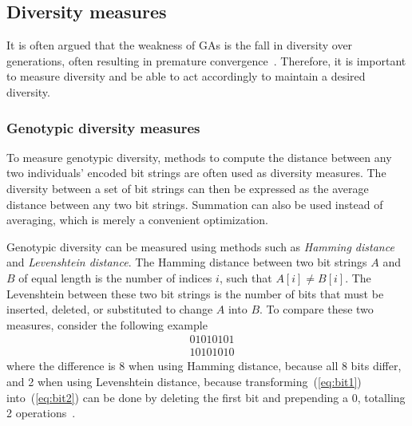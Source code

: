 \subsection{Diversity measures}
\label{sec:diversitymeasures}
It is often argued that the weakness of GAs is the fall in diversity over generations, often resulting in premature convergence~\cite{diaz2007empirical, 1266373,Zitzler00comparisonof}. Therefore, it is important to measure diversity and be able to act accordingly to maintain a desired diversity.

\subsubsection{Genotypic diversity measures}
To measure genotypic diversity, methods to compute the distance between any two individuals' encoded bit strings are often used as diversity measures. The diversity between a set of bit strings can then be expressed as the average distance between any two bit strings. Summation can also be used instead of averaging, which is merely a convenient optimization.

Genotypic diversity can be measured using methods such as \emph{Hamming distance} and \emph{Levenshtein distance}. The Hamming distance between two bit strings $A$ and $B$ of equal length is the number of indices $i$, such that $A[i] \neq B[i]$. The Levenshtein between these two bit strings is the number of bits that must be inserted, deleted, or substituted to change $A$ into $B$. To compare these two measures, consider the following example 
%
\begin{align}
  &01010101\label{eq:bit1} \\
  &10101010\label{eq:bit2}
\end{align}
%
where the difference is 8 when using Hamming distance, because all 8 bits differ, and 2 when using Levenshtein distance, because transforming~(\ref{eq:bit1}) into~(\ref{eq:bit2}) can be done by deleting the first bit and prepending a $0$, totalling 2 operations~\cite{1250187}.

